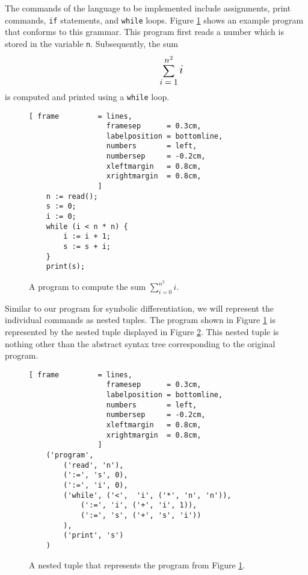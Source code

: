 The commands of the language to be implemented include assignments, print commands,
\texttt{if} statements, and \texttt{while} loops. Figure \ref{fig:sum.sl} shows
an example program that conforms to this grammar. This program first reads a number
which is stored in the variable \texttt{n}. Subsequently, the sum
\[
\hspace*{1.3cm}
\displaystyle\sum\limits_{\mbox{$\normalsize i=1$}}^{\mbox{$\normalsize n^2$}} \mbox{\Large $i$}
\]
is computed and printed using a \texttt{while} loop.

\begin{figure}[!ht]
\centering
\begin{Verbatim}[ frame         = lines, 
                  framesep      = 0.3cm, 
                  labelposition = bottomline,
                  numbers       = left,
                  numbersep     = -0.2cm,
                  xleftmargin   = 0.8cm,
                  xrightmargin  = 0.8cm,
                ]
    n := read();
    s := 0;
    i := 0;
    while (i < n * n) {
        i := i + 1;
        s := s + i;
    }
    print(s);
\end{Verbatim}
\vspace*{-0.3cm}
\caption{A program to compute the sum $\sum\limits_{i=0}^{n^2} i$.}
\label{fig:sum.sl}
\end{figure}
\FloatBarrier

Similar to our program for symbolic differentiation, we will represent the individual commands as
nested tuples. The program shown in Figure \ref{fig:sum.sl} is represented by the nested tuple displayed in
Figure \ref{fig:sum.ast}. This nested tuple is nothing other than the abstract syntax tree
corresponding to the original program. 

\begin{figure}[!ht]
\centering
\begin{Verbatim}[ frame         = lines, 
                  framesep      = 0.3cm, 
                  labelposition = bottomline,
                  numbers       = left,
                  numbersep     = -0.2cm,
                  xleftmargin   = 0.8cm,
                  xrightmargin  = 0.8cm,
                ]
    ('program',
        ('read', 'n'),
        (':=', 's', 0),
        (':=', 'i', 0),
        ('while', ('<',  'i', ('*', 'n', 'n')),
            (':=', 'i', ('+', 'i', 1)),
            (':=', 's', ('+', 's', 'i'))
        ),
        ('print', 's')
    )
\end{Verbatim}
\vspace*{-0.3cm}
\caption{A nested tuple that represents the program from Figure \ref{fig:sum.sl}.}
\label{fig:sum.ast}
\end{figure}

